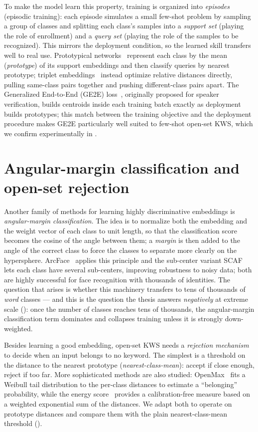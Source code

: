 \documentclass[12pt,a4paper]{report}
\begin{document}
To make the model learn this property, training is organized into
\emph{episodes} (episodic training): each episode simulates a small few-shot
problem by sampling a group of classes and splitting each class's samples into a
\emph{support set} (playing the role of enrollment) and a \emph{query set}
(playing the role of the samples to be recognized). This mirrors the deployment
condition, so the learned skill transfers well to real use. Prototypical
networks~\cite{snell2017prototypical} represent each class by the mean
(\emph{prototype}) of its support embeddings and then classify queries by nearest
prototype; triplet embeddings~\cite{schroff2015facenet} instead optimize relative
distances directly, pulling same-class pairs together and pushing different-class
pairs apart. The Generalized End-to-End (GE2E) loss~\cite{wan2018ge2e}, originally
proposed for speaker verification, builds centroids inside each training batch
exactly as deployment builds prototypes; this match between the training objective
and the deployment procedure makes GE2E particularly well suited to few-shot
open-set KWS, which we confirm experimentally in .

\section{Angular-margin classification and open-set rejection}\label{sec:arc-bg}

Another family of methods for learning highly discriminative embeddings is
\emph{angular-margin classification}. The idea is to normalize both the embedding
and the weight vector of each class to unit length, so that the classification
score becomes the cosine of the angle between them; a \emph{margin} is then added
to the angle of the correct class to force the classes to separate more clearly on
the hypersphere. ArcFace~\cite{deng2019arcface} applies this principle and the
sub-center variant SCAF~\cite{deng2020subcenter} lets each class have several
sub-centers, improving robustness to noisy data; both are highly successful for
face recognition with thousands of identities. The question that arises is whether this
machinery transfers to tens of thousands of \emph{word} classes --- and this is
the question the thesis answers \emph{negatively} at extreme scale
(): once the number of classes reaches tens of thousands, the
angular-margin classification term dominates and collapses training unless it is
strongly down-weighted.

Besides learning a good embedding, open-set KWS needs a \emph{rejection mechanism}
to decide when an input belongs to no keyword. The simplest is a threshold on the
distance to the nearest prototype (\emph{nearest-class-mean}): accept if close
enough, reject if too far. More sophisticated methods are also studied:
OpenMax~\cite{bendale2016openmax} fits a Weibull tail distribution to the
per-class distances to estimate a ``belonging'' probability, while the energy
score~\cite{liu2020energy} provides a calibration-free measure based on a weighted
exponential sum of the distances. We adapt both to operate on prototype distances
and compare them with the plain nearest-class-mean threshold ().
\end{document}
